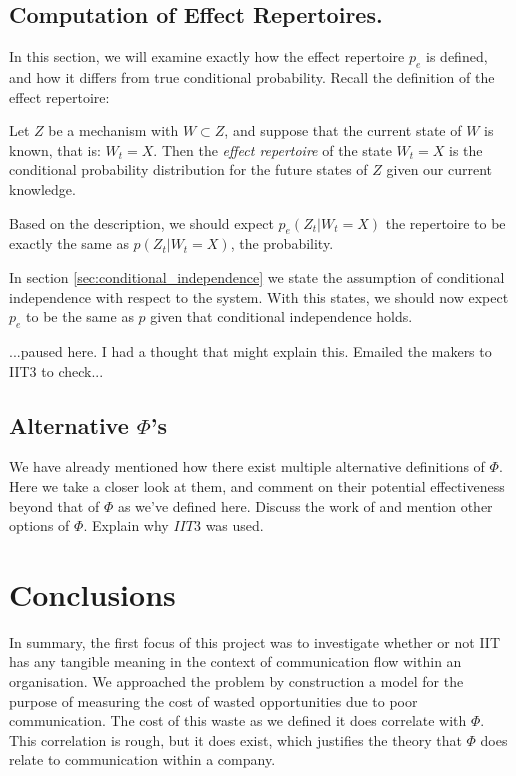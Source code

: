 \subsection{Computation of Effect Repertoires.}

In this section, we will examine exactly how the effect repertoire $p_e$ is defined, and how it differs from true conditional probability. Recall the definition of the effect repertoire:

\begin{definition}
Let $Z$ be a mechanism with $W\subset Z$, and suppose that the current state of $W$ is known, that is: $W_t = X$. Then the \textit{effect repertoire} of the state $W_t = X$ is the conditional probability distribution for the future states of $Z$ given our current knowledge.
\end{definition}

Based on the description, we should expect $p_e(Z_t|W_t = X)$ the repertoire to be exactly the same as $p(Z_t|W_t = X)$, the probability. 

In section \ref{sec:conditional_independence} we state the assumption of conditional independence with respect to the system. With this states, we should now expect $p_e$ to be the same as $p$ given that conditional independence holds.

...paused here. I had a thought that might explain this. Emailed the makers to IIT3 to check...


\subsection{Alternative $\Phi$'s}
We have already mentioned how there exist multiple alternative definitions of $\Phi$. Here we take a closer look at them, and comment on their potential effectiveness beyond that of $\Phi$ as we've defined here.
Discuss the work of \cite{tegmark2016improved} and mention other options of $\Phi$. Explain why $IIT3$ was used.

\section{Conclusions}
In summary, the first focus of this project was to investigate whether or not IIT has any tangible meaning in the context of communication flow within an organisation. We approached the problem by construction a model for the purpose of measuring the cost of wasted opportunities due to poor communication. The cost of this waste as we defined it does correlate with $\Phi$. This correlation is rough, but it does exist, which justifies the theory that $\Phi$ does relate to communication within a company. 

